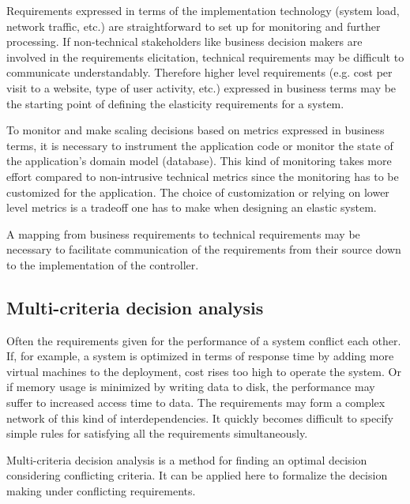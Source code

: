 \documentclass[english]{tktltiki2}
\theoremstyle{definition}
\theoremstyle{remark}
\begin{document}
Requirements expressed in terms of the implementation technology (system load,
network traffic, etc.) are straightforward to set up for monitoring and further
processing. If non-technical stakeholders like business decision makers are
involved in the requirements elicitation, technical requirements may be
difficult to communicate understandably. Therefore higher level requirements
(e.g. cost per visit to a website, type of user activity, etc.) expressed in
business terms may be the starting point of defining the elasticity requirements
for a system.

To monitor and make scaling decisions based on metrics expressed in business
terms, it is necessary to instrument the application code or monitor the state
of the application's domain model (database). This kind of monitoring takes more
effort compared to non-intrusive technical metrics since the monitoring has to
be customized for the application. The choice of customization or relying on
lower level metrics is a tradeoff one has to make when designing an elastic
system.

A mapping from business requirements to technical requirements may be necessary
to facilitate communication of the requirements from their source down to the
implementation of the controller. 

\subsection{Multi-criteria decision analysis} Often the requirements given for
the performance of a system conflict each other. If, for example, a system is
optimized in terms of response time by adding more virtual machines to the
deployment, cost rises too high to operate the system. Or if memory usage is
minimized by writing data to disk, the performance may suffer to increased
access time to data. The requirements may form a complex network of this kind of
interdependencies. It quickly becomes difficult to specify simple rules for
satisfying all the requirements simultaneously.

Multi-criteria decision analysis  is a method
for finding an optimal decision considering conflicting criteria. It can be
applied here to formalize the decision making under conflicting requirements.

\end{document}
